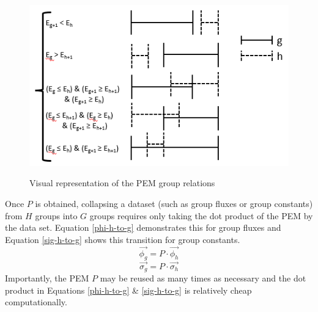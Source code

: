 \documentclass{article}
\begin{document}
\begin{figure}
\caption{Visual representation of the PEM group relations}
\includegraphics[scale=0.8]{bin_graphic.png}
\label{fig:bin_graph}
\end{figure}
Once $P$ is obtained, collapsing a dataset (such as group fluxes or group constants) from $H$
groups into $G$ groups requires only taking the dot product of the PEM
by the data set. Equation \ref{phi-h-to-g} demonstrates this for group fluxes and Equation
\ref{sig-h-to-g} shows this transition for group constants.
\begin{equation}
\label{phi-h-to-g}
\vec{\phi_g} = P \cdot \vec{\phi_h}
\end{equation}
\begin{equation}
\label{sig-h-to-g}
\vec{\sigma_g} = P \cdot \vec{\sigma_h}
\end{equation}
Importantly, the PEM $P$ may be reused as many times as necessary and the dot product in
Equations \ref{phi-h-to-g} \& \ref{sig-h-to-g} is relatively cheap computationally.
\end{document}

